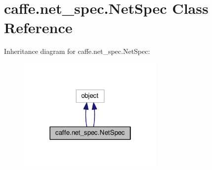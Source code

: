 \hypertarget{classcaffe_1_1net__spec_1_1_net_spec}{}\section{caffe.\+net\+\_\+spec.\+Net\+Spec Class Reference}
\label{classcaffe_1_1net__spec_1_1_net_spec}


Inheritance diagram for caffe.\+net\+\_\+spec.\+Net\+Spec\+:
\nopagebreak
\begin{figure}[H]
\begin{center}
\leavevmode
\includegraphics[width=202pt]{classcaffe_1_1net__spec_1_1_net_spec__inherit__graph}
\end{center}
\end{figure}
